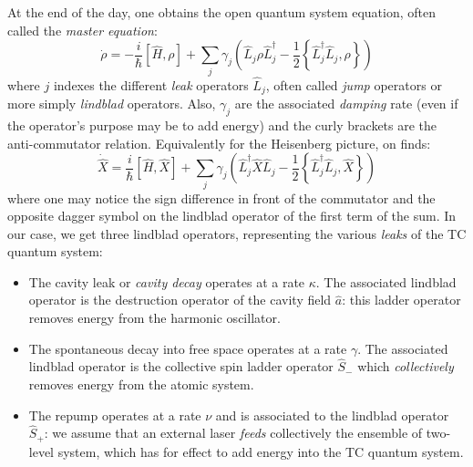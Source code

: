 \documentclass[12pt]{report}
\begin{document}
At the end of the day, one obtains the open quantum system equation, often called the \textit{master equation}:
\begin{equation}
\dot{\rho} = -\frac{i}{\hbar} \left[ \hat{H}, \rho \right] + \sum_j \gamma_j \left( \hat{L}_j \rho \hat{L}_j^\dagger - \frac{1}{2} \left\lbrace \hat{L}_j^\dagger \hat{L}_j, \rho \right\rbrace \right)
\end{equation}
where $j$ indexes the different \textit{leak} operators $\hat{L}_j$, often called \textit{jump} operators or more simply \textit{lindblad} operators. Also, $\gamma_j$ are the associated \textit{damping} rate (even if the operator's purpose may be to add energy) and the curly brackets are the anti-commutator relation.
Equivalently for the Heisenberg picture, on finds:
\begin{equation}
\label{master_eq_heis}
\dot{\hat{X}} = \frac{i}{\hbar} \left[ \hat{H}, \hat{X} \right] + \sum_j \gamma_j \left( \hat{L}_j^\dagger \hat{X} \hat{L}_j - \frac{1}{2} \left\lbrace \hat{L}_j^\dagger \hat{L}_j, \hat{X} \right\rbrace \right)
\end{equation}
where one may notice the sign difference in front of the commutator and the opposite dagger symbol on the lindblad operator of the first term of the sum.
In our case, we get three lindblad operators, representing the various \textit{leaks} of the TC quantum system:
\begin{itemize}
	\item The cavity leak or \textit{cavity decay} operates at a rate $\kappa$. The associated lindblad operator is the destruction operator of the cavity field $\hat{a}$: this ladder operator removes energy from the harmonic oscillator.
	\item The spontaneous decay into free space operates at a rate $\gamma$. The associated lindblad operator is the collective spin ladder operator $\hat{S}_-$ which \textit{collectively} removes energy from the atomic system.
	\item The repump operates at a rate $\nu$ and is associated to the lindblad operator $\hat{S}_+$: we assume that an external laser \textit{feeds} collectively the ensemble of two-level system, which has for effect to add energy into the TC quantum system.
\end{itemize}
\end{document}
